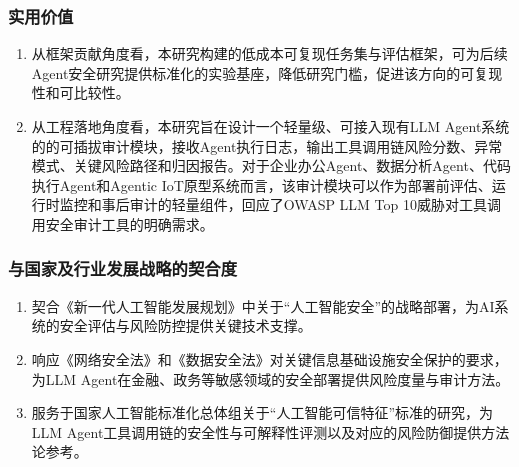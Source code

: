 \subsubsection{实用价值}

\begin{enumerate}
  \item 从框架贡献角度看，本研究构建的低成本可复现任务集与评估框架，可为后续Agent安全研究提供标准化的实验基座，降低研究门槛，促进该方向的可复现性和可比较性。
  
  \item 从工程落地角度看，本研究旨在设计一个轻量级、可接入现有LLM Agent系统的的可插拔审计模块，接收Agent执行日志，输出工具调用链风险分数、异常模式、关键风险路径和归因报告。对于企业办公Agent、数据分析Agent、代码执行Agent和Agentic IoT原型系统而言，该审计模块可以作为部署前评估、运行时监控和事后审计的轻量组件，回应了OWASP LLM Top 10威胁\cite{owasp2025llmtop10}对工具调用安全审计工具的明确需求。
\end{enumerate}

\subsubsection{与国家及行业发展战略的契合度}

\begin{enumerate}
  \item 契合《新一代人工智能发展规划》中关于“人工智能安全”的战略部署，为AI系统的安全评估与风险防控提供关键技术支撑。
  \item 响应《网络安全法》和《数据安全法》对关键信息基础设施安全保护的要求，为LLM Agent在金融、政务等敏感领域的安全部署提供风险度量与审计方法。
  \item 服务于国家人工智能标准化总体组关于“人工智能可信特征”标准的研究，为LLM Agent工具调用链的安全性与可解释性评测以及对应的风险防御提供方法论参考。
\end{enumerate}

